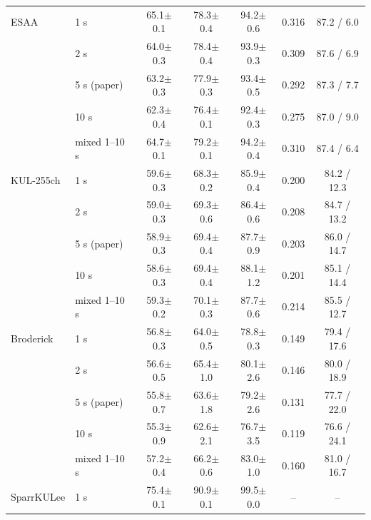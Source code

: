 \begin{tabular}{llccccc}
\midrule
ESAA & 1 s & 65.1{\scriptsize$\pm$0.1} & 78.3{\scriptsize$\pm$0.4} & 94.2{\scriptsize$\pm$0.6} & 0.316 & 87.2 / 6.0 \\
 & 2 s & 64.0{\scriptsize$\pm$0.3} & 78.4{\scriptsize$\pm$0.4} & 93.9{\scriptsize$\pm$0.3} & 0.309 & 87.6 / 6.9 \\
 & 5 s (paper) & 63.2{\scriptsize$\pm$0.3} & 77.9{\scriptsize$\pm$0.3} & 93.4{\scriptsize$\pm$0.5} & 0.292 & 87.3 / 7.7 \\
 & 10 s & 62.3{\scriptsize$\pm$0.4} & 76.4{\scriptsize$\pm$0.1} & 92.4{\scriptsize$\pm$0.3} & 0.275 & 87.0 / 9.0 \\
 & mixed 1--10 s & 64.7{\scriptsize$\pm$0.1} & 79.2{\scriptsize$\pm$0.1} & 94.2{\scriptsize$\pm$0.4} & 0.310 & 87.4 / 6.4 \\
\midrule
KUL-255ch & 1 s & 59.6{\scriptsize$\pm$0.3} & 68.3{\scriptsize$\pm$0.2} & 85.9{\scriptsize$\pm$0.4} & 0.200 & 84.2 / 12.3 \\
 & 2 s & 59.0{\scriptsize$\pm$0.3} & 69.3{\scriptsize$\pm$0.6} & 86.4{\scriptsize$\pm$0.6} & 0.208 & 84.7 / 13.2 \\
 & 5 s (paper) & 58.9{\scriptsize$\pm$0.3} & 69.4{\scriptsize$\pm$0.4} & 87.7{\scriptsize$\pm$0.9} & 0.203 & 86.0 / 14.7 \\
 & 10 s & 58.6{\scriptsize$\pm$0.3} & 69.4{\scriptsize$\pm$0.4} & 88.1{\scriptsize$\pm$1.2} & 0.201 & 85.1 / 14.4 \\
 & mixed 1--10 s & 59.3{\scriptsize$\pm$0.2} & 70.1{\scriptsize$\pm$0.3} & 87.7{\scriptsize$\pm$0.6} & 0.214 & 85.5 / 12.7 \\
\midrule
Broderick & 1 s & 56.8{\scriptsize$\pm$0.3} & 64.0{\scriptsize$\pm$0.5} & 78.8{\scriptsize$\pm$0.3} & 0.149 & 79.4 / 17.6 \\
 & 2 s & 56.6{\scriptsize$\pm$0.5} & 65.4{\scriptsize$\pm$1.0} & 80.1{\scriptsize$\pm$2.6} & 0.146 & 80.0 / 18.9 \\
 & 5 s (paper) & 55.8{\scriptsize$\pm$0.7} & 63.6{\scriptsize$\pm$1.8} & 79.2{\scriptsize$\pm$2.6} & 0.131 & 77.7 / 22.0 \\
 & 10 s & 55.3{\scriptsize$\pm$0.9} & 62.6{\scriptsize$\pm$2.1} & 76.7{\scriptsize$\pm$3.5} & 0.119 & 76.6 / 24.1 \\
 & mixed 1--10 s & 57.2{\scriptsize$\pm$0.4} & 66.2{\scriptsize$\pm$0.6} & 83.0{\scriptsize$\pm$1.0} & 0.160 & 81.0 / 16.7 \\
\midrule
SparrKULee & 1 s & 75.4{\scriptsize$\pm$0.1} & 90.9{\scriptsize$\pm$0.1} & 99.5{\scriptsize$\pm$0.0} & -- & -- \\

\end{tabular}
